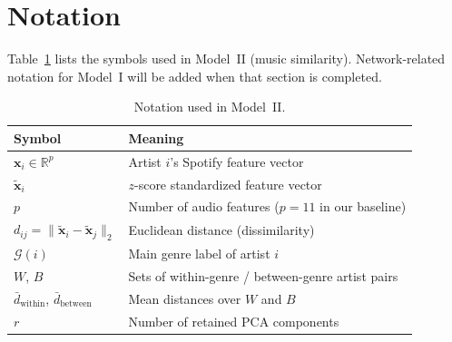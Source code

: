 \section{Notation}\label{sec:notation}

Table~\ref{tab:notation-model-ii} lists the symbols used in Model~II (music similarity).
Network-related notation for Model~I will be added when that section is completed.

\begin{table}[htbp]
\centering
\caption{Notation used in Model~II.}
\label{tab:notation-model-ii}
\begin{tabular}{@{}ll@{}}
\toprule
Symbol & Meaning \\
\midrule
$\mathbf{x}_i\in\mathbb{R}^{p}$ & Artist $i$'s Spotify feature vector \\
$\tilde{\mathbf{x}}_i$ & $z$-score standardized feature vector \\
$p$ & Number of audio features ($p=11$ in our baseline) \\
$d_{ij}=\|\tilde{\mathbf{x}}_i-\tilde{\mathbf{x}}_j\|_2$ & Euclidean distance (dissimilarity) \\
$\mathcal{G}(i)$ & Main genre label of artist $i$ \\
$W$, $B$ & Sets of within-genre / between-genre artist pairs \\
$\bar{d}_{\mathrm{within}}$, $\bar{d}_{\mathrm{between}}$ & Mean distances over $W$ and $B$ \\
$r$ & Number of retained PCA components \\
\bottomrule
\end{tabular}
\end{table}

